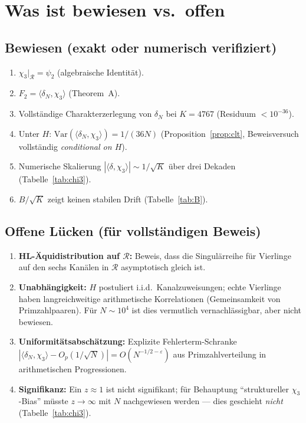 \documentclass[11pt,a4paper]{article}
\newcommand{\R}{\mathcal{R}}
\newcommand{\Var}{\mathrm{Var}}
\begin{document}
\section{Was ist bewiesen vs.\ offen}

\subsection{Bewiesen (exakt oder numerisch verifiziert)}

\begin{enumerate}
  \item $\chi_3|_{\R}=\psi_2$ (algebraische Identität).
  \item $F_2=\langle\delta_N,\chi_3\rangle$ (Theorem~A).
  \item Vollständige Charakterzerlegung von $\delta_N$ bei $K=4767$
        (Residuum $<10^{-36}$).
  \item Unter $H$: $\Var(\langle\delta_N,\chi_3\rangle)=1/(36N)$
        (Proposition~\ref{prop:clt}, Beweisversuch vollständig
        \emph{conditional on $H$}).
  \item Numerische Skalierung $|\langle\delta,\chi_3\rangle|\sim 1/\sqrt{K}$
        über drei Dekaden (Tabelle~\ref{tab:chi3}).
  \item $B/\sqrt{K}$ zeigt keinen stabilen Drift (Tabelle~\ref{tab:B}).
\end{enumerate}

\subsection{Offene Lücken (für vollständigen Beweis)}

\begin{enumerate}
  \item \textbf{HL-Äquidistribution auf $\R$:}
        Beweis, dass die Singulärreihe für Vierlinge auf den
        sechs Kanälen in $\R$ asymptotisch gleich ist.
  \item \textbf{Unabhängigkeit:}
        $H$ postuliert i.i.d.\ Kanalzuweisungen; echte Vierlinge
        haben langreichweitige arithmetische Korrelationen
        (Gemeinsamkeit von Primzahlpaaren). Für $N\sim 10^4$
        ist dies vermutlich vernachlässigbar, aber nicht bewiesen.
  \item \textbf{Uniformitätsabschätzung:}
        Explizite Fehlerterm-Schranke
        $|\langle\delta_N,\chi_3\rangle - O_p(1/\sqrt{N})|
        = O(N^{-1/2-\varepsilon})$ aus Primzahlverteilung in
        arithmetischen Progressionen.
  \item \textbf{Signifikanz:}
        Ein $z\approx 1$ ist nicht signifikant; für Behauptung
        ``struktureller $\chi_3$-Bias'' müsste $z\to\infty$ mit $N$
        nachgewiesen werden --- dies geschieht \emph{nicht}
        (Tabelle~\ref{tab:chi3}).
\end{enumerate}
\end{document}
